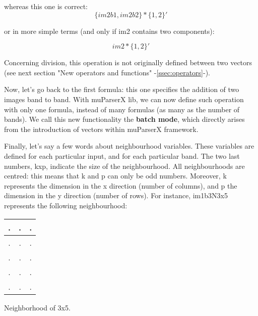 whereas this one is correct:
\begin{equation}
  \{im2b1,im2b2\} * \{1,2\}'
\end{equation}

or in more simple terms (and only if im2 contains two components): 

\begin{equation}
  im2* \{1,2\}'
\end{equation}

Concerning division, this operation is not originally defined between 
two vectors (see next section "New operators and functions" -\ref{ssec:operators}-).

\begin{center}
\end{center}

Now, let's go back to the first formula: this one specifies the addition 
of two images band to band. With muParserX lib, we can now define such 
operation with only one formula, instead of many formulas (as many as 
the number of bands). We call this new functionality the \textbf{batch mode}, 
which directly arises from the introduction of vectors within muParserX framework.

Finally, let's say a few words about neighbourhood variables. 
These variables are defined for each particular input, and for each 
particular band. The two last numbers, kxp, indicate the size of the 
neighbourhood. All neighbourhoods are centred: this means that k and p 
can only be odd numbers. Moreover, k represents the dimension in the 
x direction (number of columns), and p the dimension in the y direction 
(number of rows). For instance, im1b3N3x5 represents the following 
neighbourhood: 

\begin{center} 
\begin{tabular}{|c|c|c|}
\hline
.	& .	& . \\
\hline
.	& .	& . \\
\hline
.	& .	& . \\
\hline
.	& .	& . \\
\hline
.	& .	& . \\
\hline
\end{tabular}
\end{center}
\caption{Neighborhood of 3x5.}
\label{correctness}


